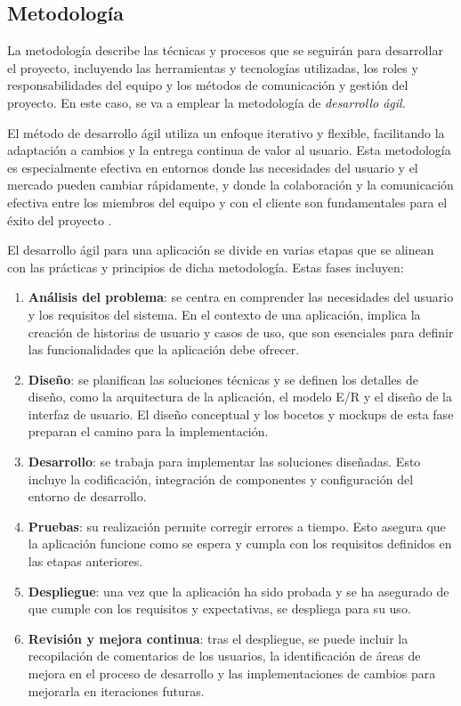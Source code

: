 \subsection{Metodología}

La metodología describe las técnicas y procesos que se seguirán para desarrollar el proyecto, incluyendo las herramientas y tecnologías utilizadas, los roles y responsabilidades del equipo y los métodos de comunicación y gestión del proyecto. En este caso, se va a emplear la metodología de \textit{desarrollo ágil}.

El método de desarrollo ágil utiliza un enfoque iterativo y flexible, facilitando la adaptación a cambios y la entrega continua de valor al usuario. Esta metodología es especialmente efectiva en entornos donde las necesidades del usuario y el mercado pueden cambiar rápidamente, y donde la colaboración y la comunicación efectiva entre los miembros del equipo y con el cliente son fundamentales para el éxito del proyecto \parencite{metodologiaAgil}.

El desarrollo ágil para una aplicación se divide en varias etapas que se alinean con las prácticas y principios de dicha metodología. Estas fases incluyen:

\begin{enumerate}
    \item \textbf{Análisis del problema}: se centra en comprender las necesidades del usuario y los requisitos del sistema. En el contexto de una aplicación, implica la creación de historias de usuario y casos de uso, que son esenciales para definir las funcionalidades que la aplicación debe ofrecer.
    \item \textbf{Diseño}: se planifican las soluciones técnicas y se definen los detalles de diseño, como la arquitectura de la aplicación, el modelo E/R y el diseño de la interfaz de usuario. El diseño conceptual y los bocetos y mockups de esta fase preparan el camino para la implementación.
    \item \textbf{Desarrollo}: se trabaja para implementar las soluciones diseñadas. Esto incluye la codificación, integración de componentes y configuración del entorno de desarrollo.
    \item \textbf{Pruebas}: su realización permite corregir errores a tiempo. Esto asegura que la aplicación funcione como se espera y cumpla con los requisitos definidos en las etapas anteriores.
    \item \textbf{Despliegue}: una vez que la aplicación ha sido probada y se ha asegurado de que cumple con los requisitos y expectativas, se despliega para su uso.
    \item \textbf{Revisión y mejora continua}: tras el despliegue, se puede incluir la recopilación de comentarios de los usuarios, la identificación de áreas de mejora en el proceso de desarrollo y las implementaciones de cambios para mejorarla en iteraciones futuras.
\end{enumerate}


